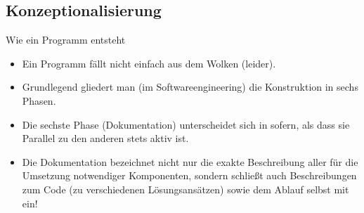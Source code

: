 \subsection{Konzeptionalisierung}

\begin{frame}{Wie ein Programm entsteht}
    \begin{itemize}[<+(1)->]
        \widei
        \item Ein Programm fällt nicht einfach aus dem Wolken (leider).
        \item Grundlegend gliedert man (im Softwareengineering) die Konstruktion in sechs Phasen.
        \item Die sechste Phase (Dokumentation) unterscheidet sich in sofern,\pause{} als dass sie Parallel zu den anderen stets aktiv ist.
        \item Die Dokumentation bezeichnet nicht nur die exakte Beschreibung aller für die Umsetzung notwendiger Komponenten,\pause{} sondern schließt auch Beschreibungen zum Code (zu verschiedenen Lösungsansätzen)\pause{} sowie dem Ablauf selbst mit ein!
    \end{itemize}
\end{frame}

